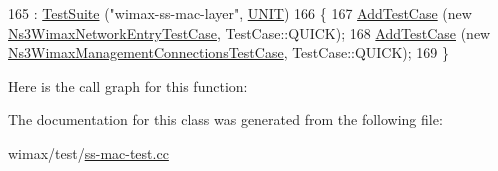 \begin{DoxyCode}
165   : \hyperlink{classns3_1_1TestSuite_a904b0c40583b744d30908aeb94636d1a}{TestSuite} (\textcolor{stringliteral}{"wimax-ss-mac-layer"}, \hyperlink{classns3_1_1TestSuite_a1ebfcab34ec8161e085e8e3a1855eae0a3885375a3787abf60431f8454b3cadbd}{UNIT})
166 \{
167   \hyperlink{classns3_1_1TestCase_a3718088e3eefd5d6454569d2e0ddd835}{AddTestCase} (\textcolor{keyword}{new} \hyperlink{classNs3WimaxNetworkEntryTestCase}{Ns3WimaxNetworkEntryTestCase}, TestCase::QUICK);
168   \hyperlink{classns3_1_1TestCase_a3718088e3eefd5d6454569d2e0ddd835}{AddTestCase} (\textcolor{keyword}{new} \hyperlink{classNs3WimaxManagementConnectionsTestCase}{Ns3WimaxManagementConnectionsTestCase}, 
      TestCase::QUICK);
169 \}
\end{DoxyCode}


Here is the call graph for this function\+:




The documentation for this class was generated from the following file\+:\begin{DoxyCompactItemize}
\item 
wimax/test/\hyperlink{ss-mac-test_8cc}{ss-\/mac-\/test.\+cc}\end{DoxyCompactItemize}
